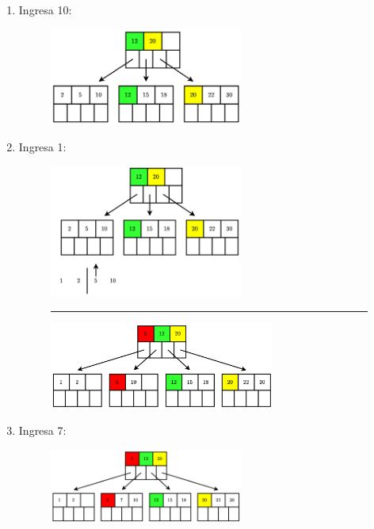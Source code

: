 \documentclass{templateNote}
\begin{document}
\begin{itemize}
\begin{enumerate}
\begin{enumerate}
\begin{enumerate}
                \item Ingresa 10:
                \begin{figure}[H]
                    \centering
                    \includegraphics[width=0.6\textwidth]{diagram/P3-1-9.png}
                \end{figure}

                \newpage
                \item Ingresa 1:
                \begin{figure}[H]
                    \centering
                    \includegraphics[width=0.6\textwidth]{diagram/P3-1-10-1.png}
                    \rule{\textwidth}{1pt}
                    \includegraphics[width=0.7\textwidth]{diagram/P3-1-10-2.png}
                \end{figure}

                \item Ingresa 7:
                \begin{figure}[H]
                    \centering
                    \includegraphics[width=0.6\textwidth]{diagram/P3-1-11.png}
                \end{figure}


\end{enumerate}
\end{enumerate}
\end{enumerate}
\end{itemize}
\end{document}
